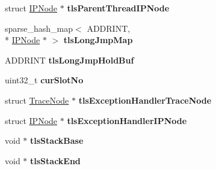 \begin{DoxyCompactItemize}
\item 
\hypertarget{structPinCCTLib_1_1ThreadData_ae3231d66f247b12d773879e9ff7c7f07}{struct \hyperlink{structPinCCTLib_1_1IPNode}{I\-P\-Node} $\ast$ {\bfseries tls\-Parent\-Thread\-I\-P\-Node}}\label{structPinCCTLib_1_1ThreadData_ae3231d66f247b12d773879e9ff7c7f07}

\item 
\hypertarget{structPinCCTLib_1_1ThreadData_a450309e714e4932319ef054e139e582d}{sparse\-\_\-hash\-\_\-map$<$ A\-D\-D\-R\-I\-N\-T, \\*
\hyperlink{structPinCCTLib_1_1IPNode}{I\-P\-Node} $\ast$ $>$ {\bfseries tls\-Long\-Jmp\-Map}}\label{structPinCCTLib_1_1ThreadData_a450309e714e4932319ef054e139e582d}

\item 
\hypertarget{structPinCCTLib_1_1ThreadData_ace21e7f997df86bf2e343604757037b6}{A\-D\-D\-R\-I\-N\-T {\bfseries tls\-Long\-Jmp\-Hold\-Buf}}\label{structPinCCTLib_1_1ThreadData_ace21e7f997df86bf2e343604757037b6}

\item 
\hypertarget{structPinCCTLib_1_1ThreadData_a930b9f562944bd034ed0f03945b58acc}{uint32\-\_\-t {\bfseries cur\-Slot\-No}}\label{structPinCCTLib_1_1ThreadData_a930b9f562944bd034ed0f03945b58acc}

\item 
\hypertarget{structPinCCTLib_1_1ThreadData_ad9e2d915ddcc797e2c915c8498aa535f}{struct \hyperlink{structPinCCTLib_1_1TraceNode}{Trace\-Node} $\ast$ {\bfseries tls\-Exception\-Handler\-Trace\-Node}}\label{structPinCCTLib_1_1ThreadData_ad9e2d915ddcc797e2c915c8498aa535f}

\item 
\hypertarget{structPinCCTLib_1_1ThreadData_a024623132a9a181fb5135f21bc68b7ab}{struct \hyperlink{structPinCCTLib_1_1IPNode}{I\-P\-Node} $\ast$ {\bfseries tls\-Exception\-Handler\-I\-P\-Node}}\label{structPinCCTLib_1_1ThreadData_a024623132a9a181fb5135f21bc68b7ab}

\item 
\hypertarget{structPinCCTLib_1_1ThreadData_aae5b70ddd82b3737b440ecc578365ff2}{void $\ast$ {\bfseries tls\-Stack\-Base}}\label{structPinCCTLib_1_1ThreadData_aae5b70ddd82b3737b440ecc578365ff2}

\item 
\hypertarget{structPinCCTLib_1_1ThreadData_ac4597aa528730595f15ad20dc8fee51a}{void $\ast$ {\bfseries tls\-Stack\-End}}\label{structPinCCTLib_1_1ThreadData_ac4597aa528730595f15ad20dc8fee51a}


\end{DoxyCompactItemize}
